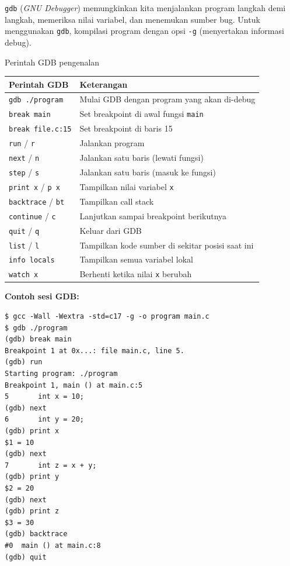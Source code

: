 \documentclass[../main.tex]{subfiles}
\begin{document}
\texttt{gdb} (\textit{GNU Debugger}) memungkinkan kita menjalankan program langkah demi langkah, memeriksa nilai variabel, dan menemukan sumber bug. Untuk menggunakan \texttt{gdb}, kompilasi program dengan opsi \texttt{-g} (menyertakan informasi debug).

\begin{modultable}[]{Perintah GDB pengenalan}
\begin{tabular}{|l|p{8cm}|}
\hline
\textbf{Perintah GDB} & \textbf{Keterangan} \\
\hline
\texttt{gdb ./program} & Mulai GDB dengan program yang akan di-debug \\
\hline
\texttt{break main} & Set breakpoint di awal fungsi \texttt{main} \\
\hline
\texttt{break file.c:15} & Set breakpoint di baris 15 \\
\hline
\texttt{run} / \texttt{r} & Jalankan program \\
\hline
\texttt{next} / \texttt{n} & Jalankan satu baris (lewati fungsi) \\
\hline
\texttt{step} / \texttt{s} & Jalankan satu baris (masuk ke fungsi) \\
\hline
\texttt{print x} / \texttt{p x} & Tampilkan nilai variabel \texttt{x} \\
\hline
\texttt{backtrace} / \texttt{bt} & Tampilkan call stack \\
\hline
\texttt{continue} / \texttt{c} & Lanjutkan sampai breakpoint berikutnya \\
\hline
\texttt{quit} / \texttt{q} & Keluar dari GDB \\
\hline
\texttt{list} / \texttt{l} & Tampilkan kode sumber di sekitar posisi saat ini \\
\hline
\texttt{info locals} & Tampilkan semua variabel lokal \\
\hline
\texttt{watch x} & Berhenti ketika nilai \texttt{x} berubah \\
\hline
\end{tabular}
\end{modultable}

\begin{contoh}
\textbf{Contoh sesi GDB:}

\begin{verbatim}
$ gcc -Wall -Wextra -std=c17 -g -o program main.c
$ gdb ./program
(gdb) break main
Breakpoint 1 at 0x...: file main.c, line 5.
(gdb) run
Starting program: ./program
Breakpoint 1, main () at main.c:5
5       int x = 10;
(gdb) next
6       int y = 20;
(gdb) print x
$1 = 10
(gdb) next
7       int z = x + y;
(gdb) print y
$2 = 20
(gdb) next
(gdb) print z
$3 = 30
(gdb) backtrace
#0  main () at main.c:8
(gdb) quit
\end{verbatim}
\end{contoh}
\end{document}
